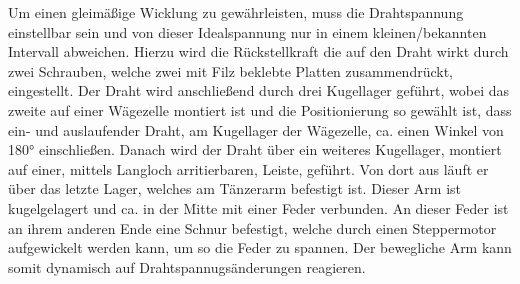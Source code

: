 Um einen gleimäßige Wicklung zu gewährleisten, muss die Drahtspannung einstellbar sein und von dieser Idealspannung nur in einem kleinen/bekannten Intervall abweichen. Hierzu wird die Rückstellkraft die auf den Draht wirkt durch zwei Schrauben, welche zwei mit Filz beklebte Platten zusammendrückt, eingestellt. Der Draht wird anschließend durch drei Kugellager geführt, wobei das zweite auf einer Wägezelle montiert ist und die Positionierung so gewählt ist, dass ein- und auslaufender Draht, am Kugellager der Wägezelle, ca. einen Winkel von 180° einschließen. Danach wird der Draht über ein weiteres Kugellager, montiert auf einer, mittels Langloch arritierbaren, Leiste, geführt. Von dort aus läuft er über das letzte Lager, welches am Tänzerarm befestigt ist. Dieser Arm ist kugelgelagert und ca. in der Mitte mit einer Feder verbunden. An dieser Feder ist an ihrem anderen Ende eine Schnur befestigt, welche durch einen Steppermotor aufgewickelt werden kann, um so die Feder zu spannen. Der bewegliche Arm kann somit dynamisch auf Drahtspannugsänderungen reagieren.

